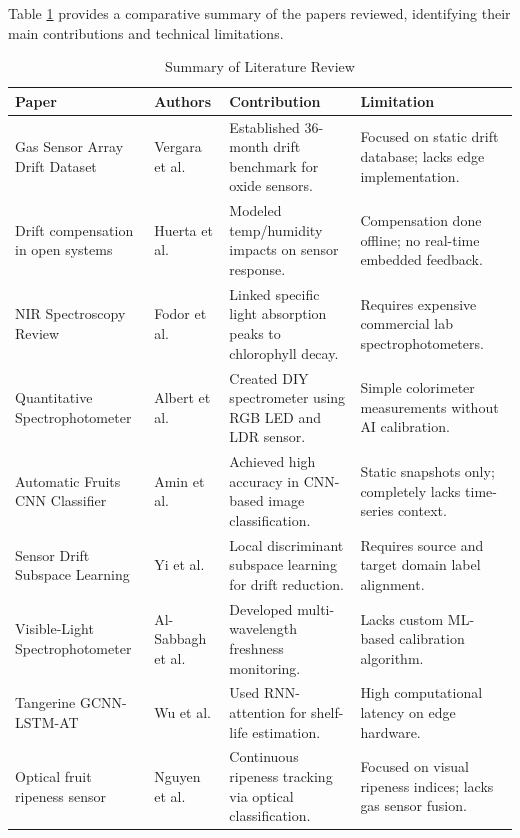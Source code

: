 Table \ref{tab:lit_review_summary} provides a comparative summary of the papers reviewed, identifying their main contributions and technical limitations.

\begin{table}[H]
\centering
\caption{Summary of Literature Review}
\label{tab:lit_review_summary}
\fontsize{8.5}{10.5}\selectfont
\begin{tabular}{|p{2.5cm}|p{2cm}|p{4.2cm}|p{4.2cm}|}
\hline
\textbf{Paper} & \textbf{Authors} & \textbf{Contribution} & \textbf{Limitation} \\ \hline
Gas Sensor Array Drift Dataset \cite{UCI2016} & Vergara et al. & Established 36-month drift benchmark for oxide sensors. & Focused on static drift database; lacks edge implementation. \\ \hline
Drift compensation in open systems \cite{Fonollosa2015} & Huerta et al. & Modeled temp/humidity impacts on sensor response. & Compensation done offline; no real-time embedded feedback. \\ \hline
NIR Spectroscopy Review \cite{Sun2018} & Fodor et al. & Linked specific light absorption peaks to chlorophyll decay. & Requires expensive commercial lab spectrophotometers. \\ \hline
Quantitative Spectrophotometer \cite{Albert2019} & Albert et al. & Created DIY spectrometer using RGB LED and LDR sensor. & Simple colorimeter measurements without AI calibration. \\ \hline
Automatic Fruits CNN Classifier \cite{Palakodati2020} & Amin et al. & Achieved high accuracy in CNN-based image classification. & Static snapshots only; completely lacks time-series context. \\ \hline
Sensor Drift Subspace Learning \cite{Yi2022} & Yi et al. & Local discriminant subspace learning for drift reduction. & Requires source and target domain label alignment. \\ \hline
Visible-Light Spectrophotometer \cite{Wang2024} & Al-Sabbagh et al. & Developed multi-wavelength freshness monitoring. & Lacks custom ML-based calibration algorithm. \\ \hline
Tangerine GCNN-LSTM-AT \cite{AttentionRNNFood2022} & Wu et al. & Used RNN-attention for shelf-life estimation. & High computational latency on edge hardware. \\ \hline
Optical fruit ripeness sensor \cite{Nguyen2024} & Nguyen et al. & Continuous ripeness tracking via optical classification. & Focused on visual ripeness indices; lacks gas sensor fusion. \\ \hline

\end{tabular}
\end{table}
